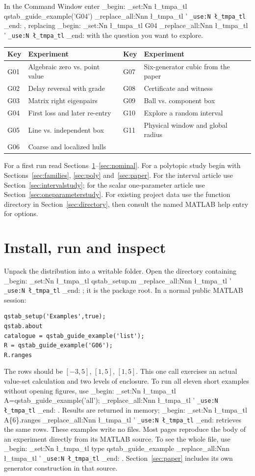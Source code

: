 \documentclass[11pt,a4paper]{article}
\newcommand{\m}[1]{
  \group_begin:
  \tl_set:Nn \l_tmpa_tl {#1}
  \tl_replace_all:Nnn \l_tmpa_tl {'}{\textquotesingle{}}
  \texttt{\tl_use:N \l_tmpa_tl}
  \group_end:
}
\newcommand{\lead}[1]{\par\smallskip\noindent{\sffamily\bfseries\color{teal}#1}\enspace}
\newcommand{\topic}[2]{\clearpage\section{#1}\label{#2}}
\begin{document}
\clearpage
{\setlength{\parskip}{0pt}\tableofcontents}
\bigskip
\lead{Example key} In the Command Window enter \m{qstab\_guide\_example('G04')}, replacing \m{G04} with the question you want to explore.
\par\smallskip\begin{tabularx}{\linewidth}{@{}lYlY@{}}\toprule
Key & Experiment & Key & Experiment\\\midrule
G01 & Algebraic zero vs. point value & G07 & Six-generator cubic from the paper\\
G02 & Delay reversal with grade & G08 & Certificate and witness\\
G03 & Matrix right eigenpairs & G09 & Ball vs. component box\\
G04 & First loss and later re-entry & G10 & Explore a random interval\\
G05 & Line vs. independent box & G11 & Physical window and global radius\\
G06 & Coarse and localized hulls &&\\\bottomrule
\end{tabularx}\par
\vfill\lead{Choose a route} For a first run read Sections~\ref{sec:start}--\ref{sec:nominal}. For a polytopic study begin with Sections~\ref{sec:families}, \ref{sec:poly} and~\ref{sec:paper}. For the interval article use Section~\ref{sec:intervalstudy}; for the scalar one-parameter article use Section~\ref{sec:oneparameterstudy}. For existing project data use the function directory in Section~\ref{sec:directory}, then consult the named MATLAB help entry for options.
\topic{Install, run and inspect}{sec:start}
Unpack the distribution into a writable folder. Open the directory containing \m{qstab\_setup.m}; it is the package root. In a normal public MATLAB session:
\begin{lstlisting}
qstab_setup('Examples',true);
qstab.about
catalogue = qstab_guide_example('list');
R = qstab_guide_example('G06');
R.ranges
\end{lstlisting}
The rows should be $[-3,5]$, $[1,5]$, $[1,5]$. This one call exercises an actual value-set calculation and two levels of enclosure. To run all eleven short examples without opening figures, use \m{A=qstab\_guide\_example('all');}. Results are returned in memory; \m{A\{6\}.ranges} retrieves the same rows. These examples write no files. Most pages reproduce the body of an experiment directly from its MATLAB source. To see the whole file, use \m{type qstab\_guide\_example}. Section~\ref{sec:paper} includes its own generator construction in that source.
\end{document}
